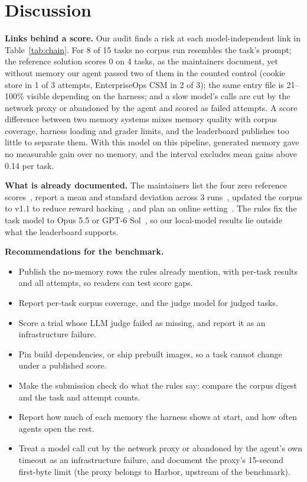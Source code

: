 \section{Discussion}
\label{sec:discussion}

\textbf{Links behind a score.}
Our audit finds a risk at each model-independent link in Table~\ref{tab:chain}.
For 8 of 15 tasks no corpus run resembles the task's prompt; the reference solution scores 0 on 4 tasks, as the maintainers document, yet without memory our agent passed two of them in the counted control (cookie store in 1 of 3 attempts, EnterpriseOps CSM in 2 of 3); the same entry file is 21--100\% visible depending on the harness; and a slow model's calls are cut by the network proxy or abandoned by the agent and scored as failed attempts.
A score difference between two memory systems mixes memory quality with corpus coverage, harness loading and grader limits, and the leaderboard publishes too little to separate them.
With this model on this pipeline, generated memory gave no measurable gain over no memory, and the interval excludes mean gains above 0.14 per task.

\textbf{What is already documented.} The maintainers list the four zero reference scores~\cite{frontiermemory-code}, report a mean and standard deviation across 3 runs~\cite{frontiermemory}, updated the corpus to v1.1 to reduce reward hacking~\cite{frontiermemory-changelog}, and plan an online setting~\cite{frontiermemory}. The rules fix the task model to Opus 5.5 or GPT-6 Sol~\cite{frontiermemory-code}, so our local-model results lie outside what the leaderboard supports.

\textbf{Recommendations for the benchmark.}
\begin{itemize}
  \item Publish the no-memory rows the rules already mention, with per-task results and all attempts, so readers can test score gaps.
  \item Report per-task corpus coverage, and the judge model for judged tasks.
  \item Score a trial whose LLM judge failed as missing, and report it as an infrastructure failure.
  \item Pin build dependencies, or ship prebuilt images, so a task cannot change under a published score.
  \item Make the submission check do what the rules say: compare the corpus digest and the task and attempt counts.
  \item Report how much of each memory the harness shows at start, and how often agents open the rest.
  \item Treat a model call cut by the network proxy or abandoned by the agent's own timeout as an infrastructure failure, and document the proxy's 15-second first-byte limit (the proxy belongs to Harbor, upstream of the benchmark).
\end{itemize}


